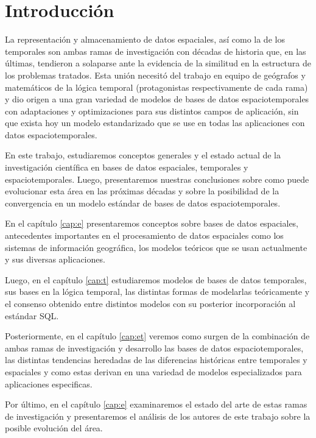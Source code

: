 \chapter{Introducción} \label{cap:intro}

La representación y almacenamiento de datos espaciales, así como la de los temporales son ambas ramas de investigación con décadas de historia que, en las últimas, tendieron a solaparse ante la evidencia de la similitud en la estructura de los problemas tratados. Esta unión necesitó del trabajo en equipo de geógrafos y matemáticos de la lógica temporal (protagonistas respectivamente de cada rama) y dio origen a una gran variedad de modelos de bases de datos espaciotemporales con adaptaciones y optimizaciones para sus distintos campos de aplicación, sin que exista hoy un modelo estandarizado que se use en todas las aplicaciones con datos espaciotemporales.

En este trabajo, estudiaremos conceptos generales y el estado actual de la investigación científica en bases de datos espaciales, temporales y espaciotemporales. Luego, presentaremos nuestras conclusiones sobre como puede evolucionar esta área en las próximas décadas y sobre la posibilidad de la convergencia en un modelo estándar de bases de datos espaciotemporales.

En el capítulo \ref{cap:e} presentaremos conceptos sobre bases de datos espaciales, antecedentes importantes en el procesamiento de datos espaciales como los sistemas de información geográfica, los modelos teóricos que se usan actualmente y sus diversas aplicaciones.

Luego, en el capítulo \ref{cap:t} estudiaremos modelos de bases de datos temporales, sus bases en la lógica temporal, las distintas formas de modelarlas teóricamente y el consenso obtenido entre distintos modelos con su posterior incorporación al estándar SQL.

Posteriormente, en el capítulo \ref{cap:et} veremos como surgen de la combinación de ambas ramas de investigación y desarrollo las bases de datos espaciotemporales, las distintas tendencias heredadas de las diferencias históricas entre temporales y espaciales y como estas derivan en una variedad de modelos especializados para aplicaciones especificas.

Por último, en el capítulo \ref{cap:e} examinaremos el estado del arte de estas ramas de investigación y presentaremos el análisis de los autores de este trabajo sobre la posible evolución del área.
